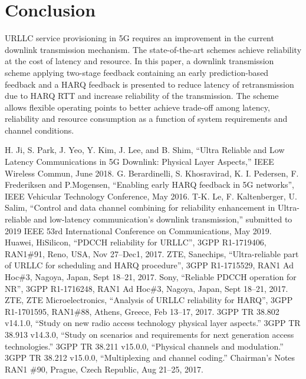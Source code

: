 \documentclass[conference]{IEEEtran}
\begin{document}
\section{Conclusion}

URLLC service provisioning in 5G requires an improvement in the current downlink transmission mechanism. The state-of-the-art schemes achieve reliability at the cost of latency and resource. In this paper, a downlink transmission scheme applying two-stage feedback containing an early prediction-based feedback and a HARQ feedback is presented to reduce latency of retransmission due to HARQ RTT and increase reliability of the transmission. The scheme allows flexible operating points to better achieve trade-off among latency, reliability and resource consumption as a function of system requirements and channel conditions.

\begin{thebibliography}{00}
 H. Ji, S. Park, J. Yeo, Y. Kim, J. Lee, and B. Shim, “Ultra Reliable and Low Latency Communications in 5G Downlink: Physical Layer Aspects,”  IEEE Wireless Commun, June 2018.
 G. Berardinelli, S. Khosravirad, K. I. Pedersen, F. Frederiksen and P.Mogensen, “Enabling early HARQ feedback in 5G networks”, IEEE Vehicular Technology Conference, May 2016.
 T-K. Le, F. Kaltenberger, U. Salim, ``Control and data channel combining for reliability enhancement in Ultra-reliable and low-latency communication's downlink transmission,'' submitted to 2019 IEEE 53rd International Conference on Communications, May 2019.
 Huawei, HiSilicon, ``PDCCH reliability for URLLC'', 3GPP R1-1719406, RAN1\#91, Reno, USA, Nov 27--Dec1, 2017.
 ZTE, Sanechips, ``Ultra-reliable part of URLLC for scheduling and HARQ procedure'', 3GPP R1-1715529, RAN1 Ad Hoc\#3, Nagoya, Japan, Sept 18--21, 2017.
 Sony, ``Reliable PDCCH operation for NR'', 3GPP R1-1716248, RAN1 Ad Hoc\#3, Nagoya, Japan, Sept 18--21, 2017.
 ZTE, ZTE Microelectronics, ``Analysis of URLLC reliability for HARQ'', 3GPP R1-1701595, RAN1\#88, Athens, Greece, Feb 13--17, 2017.
 3GPP TR 38.802 v14.1.0, ``Study on new radio access technology physical layer aspects.''
 3GPP TR 38.913 v14.3.0, ``Study on scenarios and requirements for next generation access technologies.''
 3GPP TR 38.211 v15.0.0, ``Physical channels and modulation.''
 3GPP TR 38.212 v15.0.0, ``Multiplexing and channel coding.''
 Chairman's Notes RAN1 \#90, Prague, Czech Republic, Aug 21--25, 2017.

\end{thebibliography}
\vspace{12pt}
\end{document}

